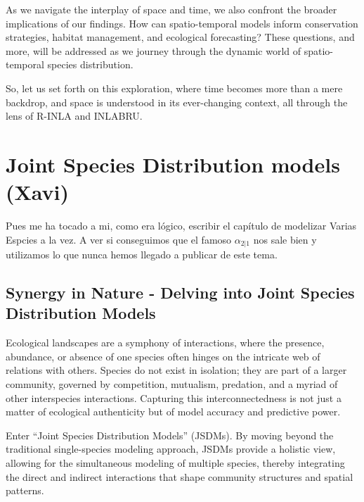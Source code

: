 \documentclass[
]{krantz}
\begin{document}
As we navigate the interplay of space and time, we also confront the broader implications of our findings. How can spatio-temporal models inform conservation strategies, habitat management, and ecological forecasting? These questions, and more, will be addressed as we journey through the dynamic world of spatio-temporal species distribution.

So, let us set forth on this exploration, where time becomes more than a mere backdrop, and space is understood in its ever-changing context, all through the lens of R-INLA and INLABRU.

\pagebreak
\setcounter{chapter}{12}
\setcounter{section}{0}
\renewcommand{\thepage}{\arabic{page}}

\hypertarget{joint-species-distribution-models-xavi}{%
\chapter{Joint Species Distribution models (Xavi)}\label{joint-species-distribution-models-xavi}}

Pues me ha tocado a mi, como era lógico, escribir el capítulo de modelizar Varias Espcies a la vez. A ver si conseguimos que el famoso \(\alpha_{2|1}\) nos sale bien y utilizamos lo que nunca hemos llegado a publicar de este tema.

\hypertarget{synergy-in-nature---delving-into-joint-species-distribution-models}{%
\section{Synergy in Nature - Delving into Joint Species Distribution Models}\label{synergy-in-nature---delving-into-joint-species-distribution-models}}

Ecological landscapes are a symphony of interactions, where the presence, abundance, or absence of one species often hinges on the intricate web of relations with others. Species do not exist in isolation; they are part of a larger community, governed by competition, mutualism, predation, and a myriad of other interspecies interactions. Capturing this interconnectedness is not just a matter of ecological authenticity but of model accuracy and predictive power.

Enter ``Joint Species Distribution Models'' (JSDMs). By moving beyond the traditional single-species modeling approach, JSDMs provide a holistic view, allowing for the simultaneous modeling of multiple species, thereby integrating the direct and indirect interactions that shape community structures and spatial patterns.
\end{document}
